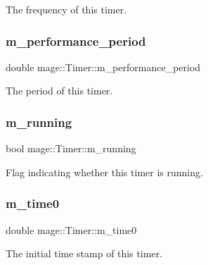 The frequency of this timer. \hypertarget{classmage_1_1_timer_a5831e973d64389b1d98fbb6c51de6436}{}\label{classmage_1_1_timer_a5831e973d64389b1d98fbb6c51de6436} 
\subsubsection{\texorpdfstring{m\+\_\+performance\+\_\+period}{m\_performance\_period}}
{\footnotesize\ttfamily double mage\+::\+Timer\+::m\+\_\+performance\+\_\+period\hspace{0.3cm}{\ttfamily [protected]}}

The period of this timer. \hypertarget{classmage_1_1_timer_ac8d975843e5b2199848284de910d3291}{}\label{classmage_1_1_timer_ac8d975843e5b2199848284de910d3291} 
\subsubsection{\texorpdfstring{m\+\_\+running}{m\_running}}
{\footnotesize\ttfamily bool mage\+::\+Timer\+::m\+\_\+running\hspace{0.3cm}{\ttfamily [protected]}}

Flag indicating whether this timer is running. \hypertarget{classmage_1_1_timer_a73fa08d14bfa273f158f967a8e58f96f}{}\label{classmage_1_1_timer_a73fa08d14bfa273f158f967a8e58f96f} 
\subsubsection{\texorpdfstring{m\+\_\+time0}{m\_time0}}
{\footnotesize\ttfamily double mage\+::\+Timer\+::m\+\_\+time0\hspace{0.3cm}{\ttfamily [protected]}}

The initial time stamp of this timer. 